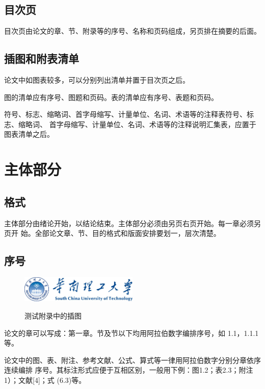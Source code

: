 \documentclass[phd,nobackinfo]{scutthesis}
\begin{document}
\subsection{目次页}

目次页由论文的章、节、附录等的序号、名称和页码组成，另页排在摘要的后面。

\subsection{插图和附表清单}

论文中如图表较多，可以分别列出清单并置于目次页之后。

图的清单应有序号、图题和页码。表的清单应有序号、表题和页码。

符号、标志、缩略词、首字母缩写、计量单位、名词、术语等的注释表符号、标志、缩略词、
首字母缩写、计量单位、名词、术语等的注释说明汇集表，应置于图表清单之后。

\section{主体部分}

\subsection{格式}

主体部分由绪论开始，以结论结束。主体部分必须由另页右页开始。每一章必须另页开
始。全部论文章、节、目的格式和版面安排要划一，层次清楚。

\subsection{序号}

\begin{figure}[htbp]
  \centering
  \includegraphics[width= 0.5\textwidth]{scutlogo.eps}\\
  \caption{测试附录中的插图}\label{fig:appendix1}
\end{figure}

论文的章可以写成：第一章。节及节以下均用阿拉伯数字编排序号，如
1.1，1.1.1等。

论文中的图、表、附注、参考文献、公式、算式等一律用阿拉伯数字分别分章依序连续编排
序号。其标注形式应便于互相区别，一般用下例：图1.2；表2.3；附注1）；文献[4]；式
  (6.3)等。
\end{document}
